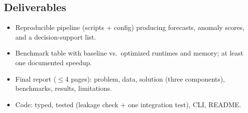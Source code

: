 \subsection{Deliverables}
\begin{itemize}[noitemsep]
    \item Reproducible pipeline (scripts + config) producing forecasts, anomaly scores, and a decision-support list.
    \item Benchmark table with baseline vs.\ optimized runtimes and memory; at least one documented speedup.
    \item Final report ($\leq$4 pages): problem, data, solution (three components), benchmarks, results, limitations.
    \item Code: typed, tested (leakage check + one integration test), CLI, README.
\end{itemize}

